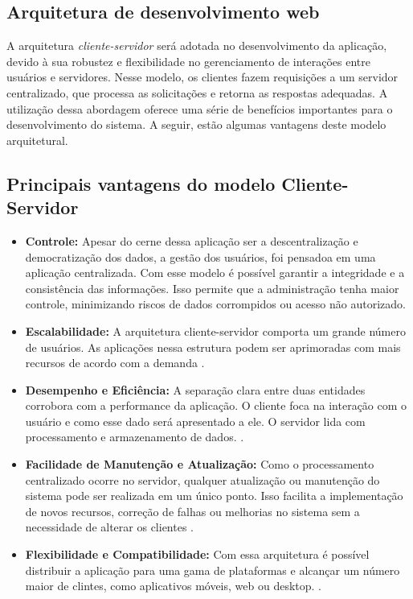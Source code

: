 \subsection{Arquitetura de desenvolvimento web}

A arquitetura \textit{cliente-servidor} será adotada no desenvolvimento da aplicação, devido à sua robustez e flexibilidade no gerenciamento de interações entre usuários e servidores. Nesse modelo, os clientes fazem requisições a um servidor centralizado, que processa as solicitações e retorna as respostas adequadas. A utilização dessa abordagem oferece uma série de benefícios importantes para o desenvolvimento do sistema. A seguir, estão algumas vantagens deste modelo arquitetural.

\subsection{Principais vantagens do modelo Cliente-Servidor}

\begin{itemize}
    \item \textbf{Controle:} Apesar do cerne dessa aplicação ser a descentralização e democratização dos dados, a gestão dos usuários, foi pensadoa em uma aplicação centralizada. Com esse modelo é possível garantir a integridade e a consistência das informações. 
    Isso permite que a administração tenha maior controle, minimizando riscos de dados corrompidos ou acesso não autorizado\cite{coulouris2011}.
    
    \item \textbf{Escalabilidade:} A arquitetura cliente-servidor comporta um grande número de usuários. As aplicações nessa estrutura podem ser aprimoradas com mais recursos de acordo com a demanda \cite{coulouris2011}.
    
    \item \textbf{Desempenho e Eficiência:} A separação clara entre duas entidades corrobora com a performance da aplicação. O cliente foca na interação com o usuário e como esse dado será apresentado a ele. O servidor lida com processamento e armazenamento de dados. \cite{coulouris2011}.
    
    \item \textbf{Facilidade de Manutenção e Atualização:} Como o processamento centralizado ocorre no servidor, qualquer atualização ou manutenção do sistema pode ser realizada em um único ponto. Isso facilita a implementação de novos recursos, correção de falhas ou melhorias no sistema sem a necessidade de alterar os clientes \cite{coulouris2011}.
    
    \item \textbf{Flexibilidade e Compatibilidade:} Com essa arquitetura é possível distribuir a aplicação para uma gama de plataformas e alcançar um número maior de clintes, como aplicativos móveis, web ou desktop. \cite{coulouris2011}. 
\end{itemize}

